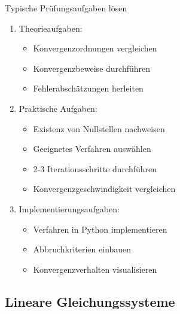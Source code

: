 \begin{KR}{Typische Prüfungsaufgaben lösen}
\begin{enumerate}
    \item Theorieaufgaben:
    \begin{itemize}
        \item Konvergenzordnungen vergleichen
        \item Konvergenzbeweise durchführen
        \item Fehlerabschätzungen herleiten
    \end{itemize}
    
    \item Praktische Aufgaben:
    \begin{itemize}
        \item Existenz von Nullstellen nachweisen
        \item Geeignetes Verfahren auswählen
        \item 2-3 Iterationsschritte durchführen
        \item Konvergenzgeschwindigkeit vergleichen
    \end{itemize}
    
    \item Implementierungsaufgaben:
    \begin{itemize}
        \item Verfahren in Python implementieren
        \item Abbruchkriterien einbauen
        \item Konvergenzverhalten visualisieren
    \end{itemize}
\end{enumerate}
\end{KR}

\subsection{Lineare Gleichungssysteme}

